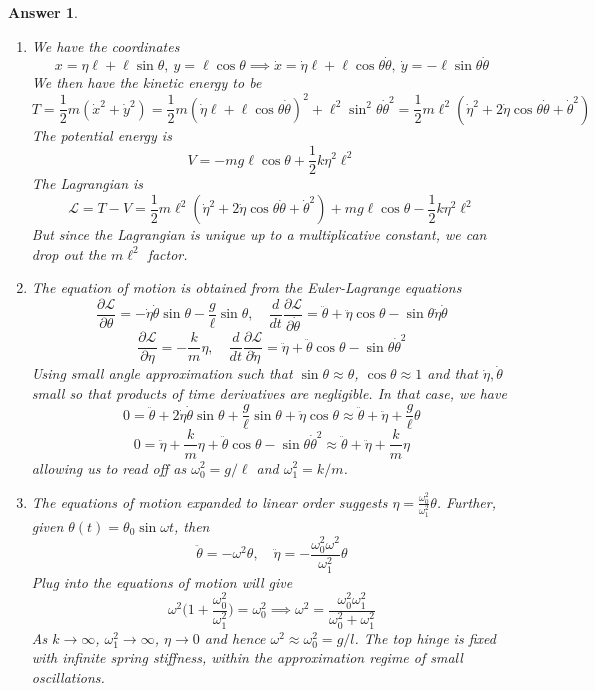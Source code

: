 \documentclass[a4paper]{article}
\newtheorem{ans}{Answer}[section]
\theoremstyle{new}
\begin{document}
\begin{ans}\leavevmode
\begin{enumerate}[label=(\alph*)]
\item We have the coordinates
$$x=\eta\ell+\ell\sin\theta,~y=\ell\cos\theta\implies\dot{x}=\dot{\eta}\ell+\ell\cos\theta\dot{\theta},~\dot{y}=-\ell\sin\theta\dot{\theta}$$
We then have the kinetic energy to be
$$T=\frac{1}{2}m(\dot{x}^2+\dot{y}^2)=\frac{1}{2}m(\dot{\eta}\ell+\ell\cos\theta\dot{\theta})^2+\ell^2\sin^2\theta\dot{\theta}^2=\frac{1}{2}m\ell^2(\dot{\eta}^2+2\dot{\eta}\cos\theta\dot{\theta}+\dot{\theta}^2)$$
The potential energy is
$$V=-mg\ell\cos\theta+\frac{1}{2}k\eta^2\ell^2$$
The Lagrangian is
$$\mathcal{L}=T-V=\frac{1}{2}m\ell^2(\dot{\eta}^2+2\dot{\eta}\cos\theta\dot{\theta}+\dot{\theta}^2)+mg\ell\cos\theta-\frac{1}{2}k\eta^2\ell^2$$
But since the Lagrangian is unique up to a multiplicative constant, we can drop out the $m\ell^2$ factor.
\item The equation of motion is obtained from the Euler-Lagrange equations
$$\frac{\partial\mathcal{L}}{\partial\theta}=-\dot{\eta}\dot{\theta}\sin\theta-\frac{g}{\ell}\sin\theta,\quad\frac{d}{dt}\frac{\partial\mathcal{L}}{\partial\dot{\theta}}=\ddot{\theta}+\ddot{\eta}\cos\theta-\sin\theta\dot{\eta}\dot{\theta}$$
$$\frac{\partial\mathcal{L}}{\partial\eta}=-\frac{k}{m}\eta,\quad\frac{d}{dt}\frac{\partial\mathcal{L}}{\partial\dot{\eta}}=\ddot{\eta}+\ddot{\theta}\cos\theta-\sin\theta\dot{\theta}^2$$
Using small angle approximation such that $\sin\theta\approx\theta$, $\cos\theta\approx1$ and that $\dot{\eta}, \dot{\theta}$ small so that products of time derivatives are negligible. In that case, we have
$$0=\ddot{\theta}+2\dot{\eta}\dot{\theta}\sin\theta+\frac{g}{\ell}\sin\theta+\ddot{\eta}\cos\theta\approx\ddot{\theta}+\ddot{\eta}+\frac{g}{\ell}\theta$$
$$0=\ddot{\eta}+\frac{k}{m}\eta+\ddot{\theta}\cos\theta-\sin\theta\dot{\theta}^2\approx\ddot{\theta}+\ddot{\eta}+\frac{k}{m}\eta$$
allowing us to read off as $\omega_0^2=g/\ell$ and $\omega_1^2=k/m$.
\item The equations of motion expanded to linear order suggests $\eta=\frac{\omega_0^2}{\omega_1^2}\theta$. Further, given $\theta(t)=\theta_0\sin\omega t$, then
$$\ddot{\theta}=-\omega^2\theta,\quad\ddot{\eta}=-\frac{\omega_0^2\omega^2}{\omega_1^2}\theta$$
Plug into the equations of motion will give
$$\omega^2\bigg(1+\frac{\omega_0^2}{\omega_1^2}\bigg)=\omega_0^2\implies\omega^2=\frac{\omega_0^2\omega_1^2}{\omega_0^2+\omega_1^2}$$
As $k\rightarrow\infty$, $\omega_1^2\rightarrow\infty$, $\eta\rightarrow 0$ and hence $\omega^2\approx\omega_0^2=g/l$. The top hinge is fixed with infinite spring stiffness, within the approximation regime of small oscillations.
\end{enumerate}
\end{ans}
\newpage
\end{document}
